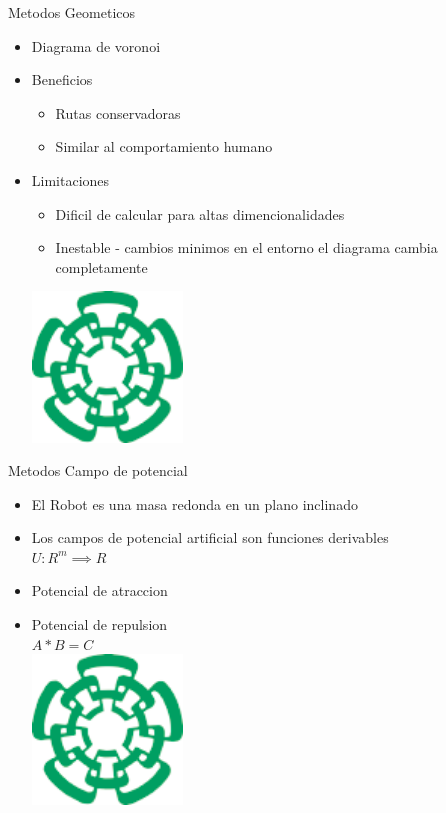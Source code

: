 \documentclass[
	11pt, %
]{beamer}
\begin{document}
\begin{frame}{Metodos Geometicos}
  \begin{itemize}
  \item Diagrama de voronoi\\
  \item Beneficios\\
    \begin{itemize}
    \item Rutas conservadoras
    \item Similar al comportamiento humano
    \end{itemize}
  \item Limitaciones\\
    \begin{itemize}
    \item Dificil de calcular para altas dimencionalidades
    \item Inestable - cambios minimos en el entorno el diagrama cambia completamente
    \end{itemize}    
    \centering
    \includegraphics[angle=45,width=4cm]{cinvestavlogo}
  \end{itemize}
\end{frame}

\begin{frame}{Metodos Campo de potencial}
  \begin{itemize}
  \item El Robot es una masa redonda en un plano inclinado \\
  \item Los campos de potencial artificial son funciones derivables\\
    $U: R^{m} \implies R$
  \item Potencial de atraccion\\
  \item Potencial de repulsion\\
    
    \centering
    $A*B=C$\\
    \includegraphics[angle=45,width=4cm]{cinvestavlogo}
  \end{itemize}
\end{frame}
\end{document}
